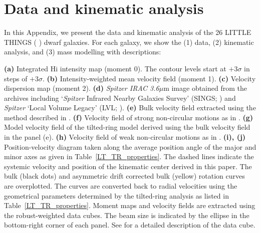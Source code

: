 \documentclass[natbib209]{emulateapj}
\begin{document}


\renewcommand{\thesection}{Appendix}
\label{Appendix}
\section{Data and kinematic analysis}

\renewcommand{\thesection}{A.\arabic{appendix_section}}
\renewcommand{\theequation}{A.\arabic{equation}}
\renewcommand{\thefigure}{A.\arabic{figure}}

In this Appendix, we present the data and kinematic analysis of the 26 LITTLE
THINGS (\citeauthor{Hunter_2012} \citeyear{Hunter_2012}) dwarf galaxies. For
each galaxy, we show the (1) data, (2) kinematic analysis, and (3) mass
modelling with descriptions: 

 {\bf (a)} Integrated H{\sc i} intensity map (moment
$0$). The contour levels start at $+3\sigma$ in steps of $+3\sigma$. {\bf (b)}
Intensity-weighted mean velocity field (moment 1). {\bf (c)} Velocity dispersion map
(moment 2). {\bf (d)} {\it Spitzer IRAC 3.6}$\mu$m image obtained
from the archives including `{\it Spitzer} Infrared Nearby Galaxies Survey' (SINGS;
\citeauthor{Kennicutt_2003} \citeyear{Kennicutt_2003}) and {\it Spitzer} `Local Volume Legacy'
(LVL; \citeauthor{2009ApJ...703..517D} \citeyear{2009ApJ...703..517D}). {\bf
(e)} Bulk velocity field extracted using the
method described in \cite{Oh_2008}. {\bf (f)} Velocity field of strong
non-circular motions as in \cite{Oh_2008}. {\bf (g)} Model velocity field
of the tilted-ring model derived using the bulk velocity field in the panel
(e). {\bf (h)} Velocity field of weak non-circular motions as in \cite{Oh_2008}.
{\bf (i), (j)} Position-velocity diagram taken along the average position
angle of the major and minor axes as given in Table~\ref{LT_TR_properties}. The
dashed lines indicate the systemic velocity and 
position of the kinematic center derived in this paper. The bulk (black dots)
and asymmetric drift corrected bulk (yellow) rotation curves are overplotted.
The curves are converted back to radial velocities using the geometrical
parameters determined by the tilted-ring analysis as listed in
Table~\ref{LT_TR_properties}. Moment maps and velocity fields are extracted
using the robust-weighted data cubes. The beam size is indicated by the ellipse
in the bottom-right corner of each panel. See \cite{Hunter_2012} for a detailed
description of the data cube.
\end{document}
